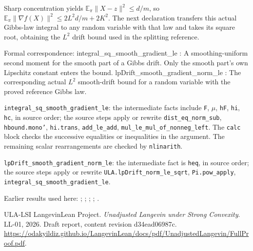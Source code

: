 \documentclass[11pt,a4paper]{article}
\begin{document}
\begin{leanbox}
Sharp concentration yields \(\mathbb E_\pi\|X-z\|^2\le d/m\), so \(\mathbb E_\pi\|\nabla f(X)\|^2\le2L^2d/m+2K^2\). The next declaration transfers this actual Gibbs-law integral to any random variable with that law and takes its square root, obtaining the \(L^2\) drift bound used in the splitting reference.



Formal correspondence: integral\_sq\_smooth\_gradient\_le : A smoothing-uniform second moment for the smooth part of a Gibbs drift. Only the smooth part's own Lipschitz constant enters the bound. lpDrift\_smooth\_gradient\_norm\_le : The corresponding actual \(L^2\) smooth-drift bound for a random variable with the proved reference Gibbs law.



\texttt{integral\_\allowbreak{}sq\_\allowbreak{}smooth\_\allowbreak{}gradient\_\allowbreak{}le}: the intermediate facts include \texttt{F}, \texttt{\ensuremath{\mu}}, \texttt{h\allowbreak{}F}, \texttt{hi}, \texttt{hc}, in source order; the source steps apply or rewrite \texttt{dist\_\allowbreak{}eq\_\allowbreak{}norm\_\allowbreak{}sub}, \texttt{hbound.\allowbreak{}mono'}, \texttt{hi.\allowbreak{}trans}, \texttt{add\_\allowbreak{}le\_\allowbreak{}add}, \texttt{mul\_\allowbreak{}le\_\allowbreak{}mul\_\allowbreak{}of\_\allowbreak{}nonneg\_\allowbreak{}left}. The \texttt{calc} block checks the successive equalities or inequalities in the argument. The remaining scalar rearrangements are checked by \texttt{nlinarith}.



\texttt{lp\allowbreak{}Drift\_\allowbreak{}smooth\_\allowbreak{}gradient\_\allowbreak{}norm\_\allowbreak{}le}: the intermediate fact is \texttt{heq}, in source order; the source steps apply or rewrite \texttt{ULA.\allowbreak{}lp\allowbreak{}Drift\_\allowbreak{}norm\_\allowbreak{}le\_\allowbreak{}sqrt}, \texttt{Pi.\allowbreak{}pow\_\allowbreak{}apply}, \texttt{integral\_\allowbreak{}sq\_\allowbreak{}smooth\_\allowbreak{}gradient\_\allowbreak{}le}.
\end{leanbox}


Earlier results used here: \cite[Section~3.13.10]{LangevinLean2026ULASC}; \cite[Section~3.13.2]{LangevinLean2026ULASC}; \cite[Section~3.26.13]{LangevinLean2026ULASC}; \cite[Section~3.26.3]{LangevinLean2026ULASC}; \cite[Section~3.49.6]{LangevinLean2026ULASC}.

\begin{thebibliography}{ULA-LSI}
LangevinLean Project. \emph{Unadjusted Langevin under Strong Convexity}. LL-01, 2026. Draft report, content revision d34ead06987c. \url{https://odakyildiz.github.io/LangevinLean/docs/pdf/UnadjustedLangevin/FullProof.pdf}.
\end{thebibliography}
\end{document}

